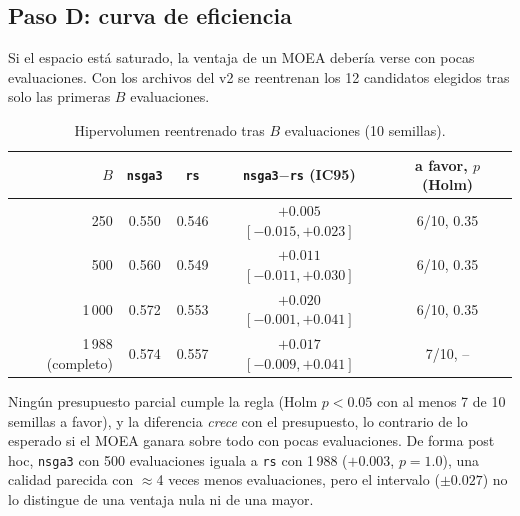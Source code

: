 \documentclass[11pt,a4paper]{article}
\begin{document}
\subsection*{Paso D: curva de eficiencia}
Si el espacio está saturado, la ventaja de un MOEA debería verse con pocas evaluaciones. Con los archivos del v2 se reentrenan los 12 candidatos elegidos tras solo las primeras $B$ evaluaciones.
\begin{table}[h]
\centering\small
\begin{tabular}{rcccc}
\toprule
$B$ & \texttt{nsga3} & \texttt{rs} & \texttt{nsga3}$-$\texttt{rs} (IC95) & a favor, $p$ (Holm)\\
\midrule
250 & 0.550 & 0.546 & $+0.005$ $[-0.015,+0.023]$ & 6/10, 0.35\\
500 & 0.560 & 0.549 & $+0.011$ $[-0.011,+0.030]$ & 6/10, 0.35\\
1\,000 & 0.572 & 0.553 & $+0.020$ $[-0.001,+0.041]$ & 6/10, 0.35\\
1\,988 (completo) & 0.574 & 0.557 & $+0.017$ $[-0.009,+0.041]$ & 7/10, --\\
\bottomrule
\end{tabular}
\caption{Hipervolumen reentrenado tras $B$ evaluaciones (10 semillas).}
\label{tab:D}
\end{table}
Ningún presupuesto parcial cumple la regla (Holm $p<0.05$ con al menos 7 de 10 semillas a favor), y la diferencia \emph{crece} con el presupuesto, lo contrario de lo esperado si el MOEA ganara sobre todo con pocas evaluaciones. De forma post hoc, \texttt{nsga3} con 500 evaluaciones iguala a \texttt{rs} con 1\,988 ($+0.003$, $p=1.0$), una calidad parecida con $\approx$4 veces menos evaluaciones, pero el intervalo ($\pm0.027$) no lo distingue de una ventaja nula ni de una mayor.
\end{document}
